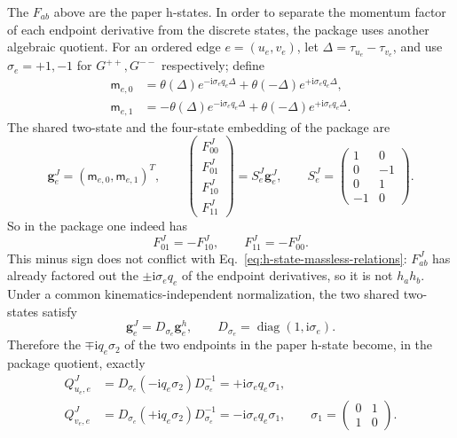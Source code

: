 \documentclass[11pt,a4paper]{article}
\newcommand{\ii}{\mathrm i}
\begin{document}
The $F_{ab}$ above are the paper h-states. In order to separate the momentum factor of each endpoint derivative from the discrete states, the package uses another algebraic quotient. For an ordered edge $e=(u_e,v_e)$, let $\Delta=\tau_{u_e}-\tau_{v_e}$, and use $\sigma_e=+1,-1$ for $G^{++},G^{--}$ respectively; define
\begin{align}
 \mathsf m_{e,0}&=\theta(\Delta)e^{-\ii\sigma_eq_e\Delta}
       +\theta(-\Delta)e^{+\ii\sigma_eq_e\Delta},\\
 \mathsf m_{e,1}&=-\theta(\Delta)e^{-\ii\sigma_eq_e\Delta}
       +\theta(-\Delta)e^{+\ii\sigma_eq_e\Delta}.
 \label{eq:package-M01}
\end{align}
The shared two-state and the four-state embedding of the package are
\begin{equation}
 \bm g_e^J=(\mathsf m_{e,0},\mathsf m_{e,1})^T,
 \qquad
 \begin{pmatrix}F^J_{00}\\F^J_{01}\\F^J_{10}\\F^J_{11}\end{pmatrix}
 =S_e^J\bm g_e^J,
 \qquad
 S_e^J=
 \begin{pmatrix}
  1&0\\0&-1\\0&1\\-1&0
 \end{pmatrix}.
 \label{eq:package-S-massless}
\end{equation}
So in the package one indeed has
\begin{equation}
 F^J_{01}=-F^J_{10},
 \qquad
 F^J_{11}=-F^J_{00}.
 \label{eq:package-quotient-relations}
\end{equation}
This minus sign does not conflict with Eq.~\eqref{eq:h-state-massless-relations}: $F^J_{ab}$ has already factored out the $\pm\ii\sigma_eq_e$ of the endpoint derivatives, so it is not $h_a h_b$. Under a common kinematics-independent normalization, the two shared two-states satisfy
\begin{equation}
 \bm g_e^J=D_{\sigma_e}\bm g_e^h,
 \qquad
 D_{\sigma_e}=\operatorname{diag}(1,\ii\sigma_e).
 \label{eq:h-to-package-basis}
\end{equation}
Therefore the $\mp\ii q_e\sigma_2$ of the two endpoints in the paper h-state become, in the package quotient, exactly
\begin{align}
 Q^J_{u_e,e}
 &=D_{\sigma_e}(-\ii q_e\sigma_2)D_{\sigma_e}^{-1}
   =+\ii\sigma_eq_e\sigma_1,\\
 Q^J_{v_e,e}
 &=D_{\sigma_e}(+\ii q_e\sigma_2)D_{\sigma_e}^{-1}
   =-\ii\sigma_eq_e\sigma_1,
 \qquad
 \sigma_1=\begin{pmatrix}0&1\\1&0\end{pmatrix}.
 \label{eq:package-endpoint-generators}
\end{align}
\end{document}
